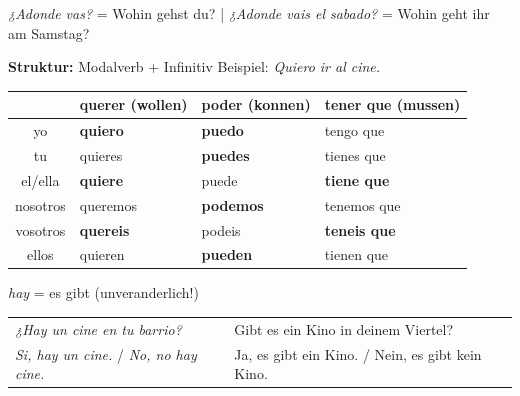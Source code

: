 \documentclass[11pt,a4paper]{article}
\newcommand{\lsg}[1]{\textcolor{loesung}{\textbf{#1}}}
\newcommand{\es}[1]{\textit{#1}}
\begin{document}
\vspace{0.3em}

\begin{merkkasten}
\es{¿Adonde vas?} = Wohin gehst du? \quad | \quad \es{¿Adonde vais el sabado?} = Wohin geht ihr am Samstag?
\end{merkkasten}

\vspace{0.3em}

\begin{merkkasten}
\vspace{0.2em}
\textbf{Struktur:} Modalverb + Infinitiv \quad Beispiel: \es{Quiero ir al cine.}

\vspace{0.3em}
\begin{tabularx}{\textwidth}{@{}|c|X|X|X|@{}}
\hline
\rowcolor{hellgrau}
& \textbf{querer} (wollen) & \textbf{poder} (konnen) & \textbf{tener que} (mussen) \\
\hline
yo & \lsg{quiero} & \lsg{puedo} & tengo que \\
\hline
tu & quieres & \lsg{puedes} & tienes que \\
\hline
el/ella & \lsg{quiere} & puede & \lsg{tiene que} \\
\hline
nosotros & queremos & \lsg{podemos} & tenemos que \\
\hline
vosotros & \lsg{quereis} & podeis & \lsg{teneis que} \\
\hline
ellos & quieren & \lsg{pueden} & tienen que \\
\hline
\end{tabularx}
\end{merkkasten}

\vspace{0.3em}

\begin{merkkasten}
\es{hay} = es gibt (unveranderlich!)

\vspace{0.2em}
\begin{tabularx}{\textwidth}{@{}XX@{}}
\es{¿Hay un cine en tu barrio?} & Gibt es ein Kino in deinem Viertel? \\
\es{Si, hay un cine.} / \es{No, no hay cine.} & Ja, es gibt ein Kino. / Nein, es gibt kein Kino. \\
\end{tabularx}
\end{merkkasten}
\end{document}
